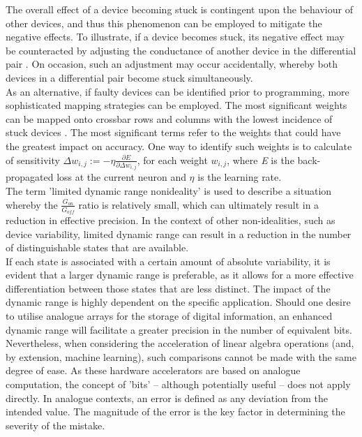\noindent The overall effect of a device becoming stuck is contingent upon the behaviour of other devices, and thus this phenomenon can be employed to mitigate the negative effects. To illustrate, if a device becomes stuck, its negative effect may be counteracted by adjusting the conductance of another device in the differential pair \cite{liu2017rescuing}. On occasion, such an adjustment may occur accidentally, whereby both devices in a differential pair become stuck simultaneously.\\

\noindent As an alternative, if faulty devices can be identified prior to programming, more sophisticated mapping strategies can be employed. The most significant weights can be mapped onto crossbar rows and columns with the lowest incidence of stuck devices \cite{gaol2021reliable}. The most significant terms refer to the weights that could have the greatest impact on accuracy. One way to identify such weights is to calculate of sensitivity $\Delta w_{i,j} := - \eta \frac{\partial E}{\partial \Delta w_{i,j}}$, for each weight $w_{i,j}$, where \textit{E} is the back-propagated loss at the current neuron and $\eta$ is the learning rate.\\

\noindent The term 'limited dynamic range nonideality' is used to describe a situation whereby the $\frac{G_{on}}{G_{off}}$ ratio is relatively small, which can ultimately result in a reduction in effective precision. In the context of other non-idealities, such as device variability, limited dynamic range can result in a reduction in the number of distinguishable states that are available. \\

\noindent If each state is associated with a certain amount of absolute variability, it is evident that a larger dynamic range is preferable, as it allows for a more effective differentiation between those states that are less distinct. The impact of the dynamic range is highly dependent on the specific application. Should one desire to utilise analogue arrays for the storage of digital information, an enhanced dynamic range will facilitate a greater precision in the number of equivalent bits.\\

\noindent Nevertheless, when considering the acceleration of linear algebra operations (and, by extension, machine learning), such comparisons cannot be made with the same degree of ease. As these hardware accelerators are based on analogue computation, the concept of 'bits' – although potentially useful – does not apply directly. In analogue contexts, an error is defined as any deviation from the intended value. The magnitude of the error is the key factor in determining the severity of the mistake. \\

